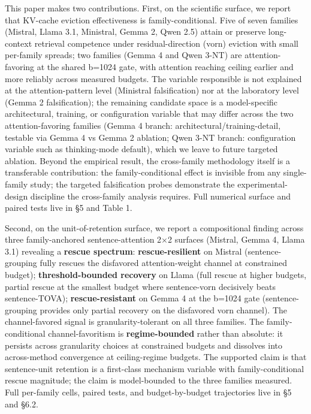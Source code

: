 \documentclass[10pt]{article}
\begin{document}
This paper makes two contributions. First, on the scientific surface,
we report that KV-cache eviction effectiveness is family-conditional.
Five of seven families (Mistral, Llama 3.1, Ministral, Gemma 2,
Qwen 2.5) attain or preserve long-context retrieval competence under
residual-direction (vorn) eviction with small per-family spreads; two families
(Gemma 4 and Qwen 3-NT) are attention-favoring at the shared b=1024
gate, with attention reaching ceiling earlier and more reliably
across measured budgets. The variable responsible is not explained
at the attention-pattern level (Ministral falsification) nor at the
laboratory level (Gemma 2 falsification); the remaining candidate space
is a model-specific architectural, training, or configuration variable
that may differ across the two attention-favoring families (Gemma 4
branch: architectural/training-detail, testable via Gemma 4 vs Gemma 2
ablation; Qwen 3-NT branch: configuration variable such as
thinking-mode default), which we leave to future targeted ablation. Beyond the empirical result, the
cross-family methodology itself is a transferable contribution: the
family-conditional effect is invisible from any single-family study; the
targeted falsification probes demonstrate the experimental-design
discipline the cross-family analysis requires. Full numerical surface
and paired tests live in \S{}5 and Table 1.

Second, on the unit-of-retention surface, we report a compositional
finding across three family-anchored sentence-attention 2$\times$2 surfaces
(Mistral, Gemma 4, Llama 3.1) revealing a \textbf{rescue spectrum}:
\textbf{rescue-resilient} on Mistral (sentence-grouping fully rescues
the disfavored attention-weight channel at constrained budget);
\textbf{threshold-bounded recovery} on Llama (full rescue at higher
budgets, partial rescue at the smallest budget where sentence-vorn
decisively beats sentence-TOVA); \textbf{rescue-resistant} on Gemma 4 at
the b=1024 gate (sentence-grouping provides only partial recovery on the
disfavored vorn channel). The channel-favored signal is
granularity-tolerant on all three families. The family-conditional
channel-favoritism is \textbf{regime-bounded} rather than absolute: it
persists across granularity choices at constrained budgets and dissolves
into across-method convergence at ceiling-regime budgets. The supported
claim is that sentence-unit retention is a first-class mechanism
variable with family-conditional rescue magnitude; the claim is
model-bounded to the three families measured. Full per-family cells,
paired tests, and budget-by-budget trajectories live in \S{}5 and \S{}6.2.
\end{document}
